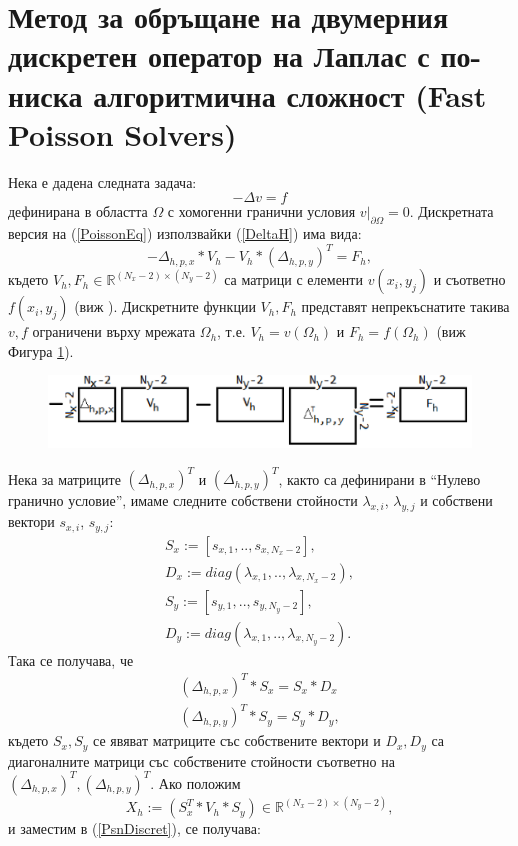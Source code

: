 \documentclass{article}
\newcommand{\be}{\begin{equation}}
\newcommand{\ee}{\end{equation}}
\newcommand{\rf}[1]{(\ref{#1})}
\newcommand{\RR}{\mathbb{R}}
\begin{document}
\section{Метод за обръщане на двумерния дискретен оператор на Лаплас с по-ниска алгоритмична сложност (Fast Poisson Solvers) }
Нека е дадена следната задача:
\be\label{PoissonEq}
-\Delta v = f
\ee
дефинирана в областта $\Omega$ с хомогенни гранични условия $v \big|_{\partial\Omega} = 0$. Дискретната версия на \rf{PoissonEq} използвайки \rf{DeltaH} има вида:
\be\label{PsnDiscret}
-\Delta_{h,p,x} *  V_h - V_h * (\Delta_{h,p,y})^T = F_h,
\ee
където $V_h, F_h \in \RR^{(N_x-2)\times(N_y-2)}$ са матрици с елементи $v(x_i,y_j)$ и съответно $f(x_i,y_j)$ (виж \cite{ref33}). Дискретните функции $V_h, F_h$ представят непрекъснатите такива $v, f$ ограничени върху мрежата $\Omega_h$, т.е. $V_h = v(\Omega_h)$ и $F_h = f(\Omega_h)$ (виж Фигура \ref{fig:FPSexplained}).
\begin{figure}[ht]
     \includegraphics[width=\linewidth]{FPSExplained.png}
	\caption{}
	\label{fig:FPSexplained}
\end{figure}
\FloatBarrier
Нека за матриците $(\Delta_{h,p,x})^T$ и $(\Delta_{h,p,y})^T$, както са дефинирани в ``Нулево гранично условие'', имаме следните собствени стойности $\lambda_{x,i}$, $\lambda_{y,j}$ и собствени вектори $s_{x,i}$, $s_{y,j}$:
\begin{align}
S_x:=[s_{x,1},..,s_{x,N_x-2}],\\
D_x:= diag(\lambda_{x,1},..,\lambda_{x,N_x-2}),\\
S_y:=[s_{y,1},..,s_{y,N_y-2}],\\
D_y:= diag(\lambda_{x,1},..,\lambda_{x,N_y-2}).
\end{align}
Така се получава, че
\begin{align}\label{eigIdentity}
(\Delta_{h,p,x})^T  * S_x = S_x * D_x\nonumber\\
(\Delta_{h,p,y})^T  * S_y = S_y * D_y,
\end{align}
където $S_x, S_y$ се явяват матриците със собствените вектори и $D_x, D_y$ са диагоналните матрици със собствените стойности съответно на $(\Delta_{h,p,x})^T, (\Delta_{h,p,y})^T$. Ако положим
\be\label{subst}
X_h := ( S_x^T * V_h * S_y ) \in \RR^{(N_x-2)\times(N_y-2)},
\ee
и заместим в \rf{PsnDiscret}, се получава:
\end{document}
